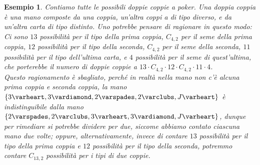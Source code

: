 \documentclass[11pt]{book}
\theoremstyle{Definizione}
\theoremstyle{TeoremaProposizioneLemmaCorollario}
\theoremstyle{OsservazioneNota}
\newtheorem{myes}{Esempio}[section]
\newcommand{\cuori}{\varheart}
\newcommand{\quadri}{\vardiamond}
\newcommand{\fiori}{\varclubs}
\newcommand{\picche}{\varspades}
\begin{document}
\begin{myes}
Contiamo tutte le possibili \textsl{doppie coppie} a poker. Una \textsl{doppia coppia} è una mano composte da una coppia, un'altra coppi a di tipo diverso, e da un'altra carta di tipo distinto. Uno potrebbe pensare di ragionare in questo modo:\\
Ci sono $13$ possibilità per il tipo della prima coppia, $C_{4,2}$ per il seme della prima coppia, $12$ possibilità per il tipo della seconda, $C_{4,2}$ per il seme della seconda, $11$ possibilità per il tipo dell'ultima carta, e $4$ possibilità per il seme di quest'ultima, che porterebbe il numero di \textsl{doppie coppie} a $13\cdot C_{4,2}\cdot 12 \cdot C_{4,2} \cdot 11 \cdot 4$.\\
Questo ragionamento è sbagliato, perché in realtà nella mano non c'è alcuna prima coppia e seconda coppia, la mano $\{3\cuori,3\quadri, 2\picche,2\fiori,J\cuori\}$ è indistinguibile dalla mano $\{2\picche,2\fiori,3\cuori,3\quadri,J\cuori\}$, dunque per rimediare si potrebbe dividere per due, siccome abbiamo contato ciascuna mano due volte; oppure, alternativamente, invece di contare $13$ possibilità per il tipo della prima coppia e $12$ possibilità per il tipo della seconda, potremmo contare $C_{13,2}$ possibilità per i tipi di due coppie.
\end{myes}
\end{document}
